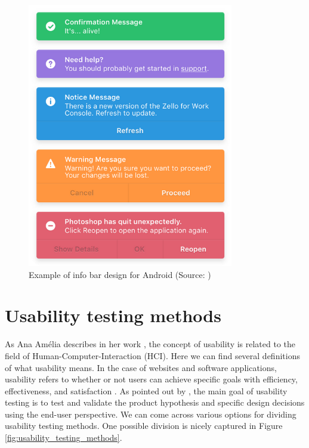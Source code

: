 \documentclass[a4paper,10pt,twoside]{article}
\begin{document}
\vspace{0.3cm}
\begin{figure}[hbt!] 
\begin{center}
\includegraphics[width=9cm]{../pictures/infobar_android.png} 
\caption[Example of info bar design for Android]{Example of info bar design for Android (Source: \cite{pinterest})}
\label{fig:infobar_android}
\end{center}
\end{figure}

\clearpage
\newpage
\vspace*{-1cm}
\section{Usability testing methods}
\label{sec:usability_testing}

\noindent As Ana Amélia describes in her work \cite{amelia}, the
concept of usability is related to the field of
Human-Computer-Interaction (HCI). Here we can find several definitions
of what usability means. In the case of websites and software
applications, usability refers to whether or not users can achieve
specific goals with efficiency, effectiveness, and satisfaction
\cite{dishman}. As pointed out by \cite{hotjar}, the main goal of
usability testing is to test and validate the product hypothesis and
specific design decisions using the end-user perspective. We can come
across various options for dividing usability testing methods. One
possible division is nicely captured in Figure
\ref{fig:usability_testing_methods}.
\end{document}
